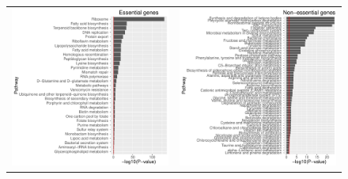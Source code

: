 \documentclass[12pt,letterpaper]{article}
\begin{document}
\begin{figure}
\centering
\begin{tabular}{c c}
\includegraphics[scale=0.4]{essential-pathways.pdf}&
\includegraphics[scale=0.4]{non-essential-pathways.pdf}\\

\end{tabular}
\end{figure}
\end{document}
